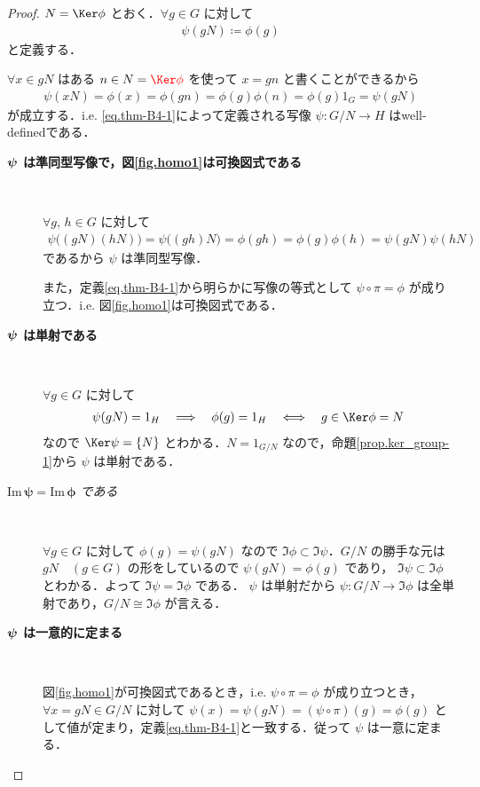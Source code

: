 \documentclass[geometry_main]{subfiles}
\begin{document}
\begin{proof}
	$N = \Ker \phi$ とおく．$\forall g \in G$ に対して
	\begin{align}
		\label{eq.thm-B4-1}
		\psi(gN) \coloneqq \phi(g)
	\end{align}
	と定義する．
	
	$\forall x \in gN$ はある $n \in N = \textcolor{red}{\Ker \phi}$ を使って $x = gn$ と書くことができるから
	\begin{align}
		\psi(xN) = \phi(x) = \phi(gn) = \phi(g) \phi(n) = \phi(g) 1_G = \psi(gN)
	\end{align}
	が成立する．i.e. \eqref{eq.thm-B4-1}によって定義される写像 $\psi \colon G/N \to H$ はwell-definedである．

	\begin{description}
		\item[\textbf{$\vb*{\psi}$ は準同型写像で，図\ref{fig.homo1}は可換図式である}]　
		
		$\forall g,\, h \in G$ に対して
		\begin{align}
			\psi \bigl( (gN)(hN) \bigr) = \psi \bigl( (gh)N \bigr) = \phi(gh) = \phi(g)\phi(h) = \psi(gN)\psi(hN)
		\end{align}
		であるから $\psi$ は準同型写像．

		また，定義\eqref{eq.thm-B4-1}から明らかに写像の等式として $\psi \circ \pi = \phi$ が成り立つ．i.e. 図\ref{fig.homo1}は可換図式である．
		
		\item[\textbf{$\vb*{\psi}$ は単射である}]　
		
		$\forall g \in G$ に対して
		\begin{align}
			\psi (gN) = 1_H \quad \Longrightarrow \quad \phi(g) = 1_H
			\quad \Longleftrightarrow \quad g \in \Ker \phi = N
		\end{align}
		なので $\Ker \psi = \{ N \}$ とわかる．$N = 1_{G/N}$ なので，命題\ref{prop.ker_group-1}から $\psi$ は単射である．

		\item[\emph{$\bm{\mathrm{Im}}\, \bm{\psi} = \bm{\mathrm{Im}}\, \bm{\phi}$ である}]　
		
		$\forall g \in G$ に対して $\phi(g) = \psi(gN)$ なので $\Im \phi \subset \Im \psi$．$G/N$ の勝手な元は $gN\quad (g \in G)$ の形をしているので $\psi(gN) = \phi(g)$ であり， $\Im \psi \subset \Im \phi$ とわかる．よって $\Im \psi = \Im \phi$ である．
		$\psi$ は単射だから $\psi \colon G/N \to \Im \phi$ は全単射であり，$G/N \cong \Im \phi$ が言える．

		\item[\textbf{$\vb*{\psi}$ は一意的に定まる}]　
		
		図\ref{fig.homo1}が可換図式であるとき，i.e. $\psi \circ \pi = \phi$ が成り立つとき，$\forall x = gN \in G/N$ に対して $\psi(x) = \psi(gN) = (\psi \circ \pi)(g) = \phi(g)$ として値が定まり，定義\eqref{eq.thm-B4-1}と一致する．従って $\psi$ は一意に定まる．
	\end{description}
\end{proof}
\end{document}
